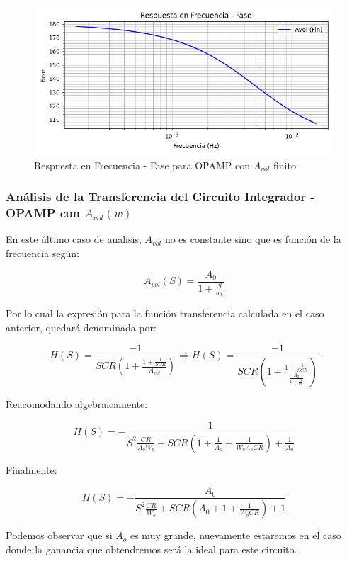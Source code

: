 \begin{figure}[H]
    \centering 
    \includegraphics [scale=1] {../Ejercicio3-CircuitoIntegradoresyDerivadores/Imagenes/teorico-avol-fin-integrador-fase.png} 
    \caption{Respuesta en Frecuencia - Fase para OPAMP con $A_{vol}$ finito}
    \label{fig:emptyPlotTool}
\end{figure}

\subsubsection{Análisis de la Transferencia del Circuito Integrador - OPAMP con $A_{vol}(w)$}

En este último caso de analisis, $A_{vol}$ no es constante sino que es función de la frecuencia según:

$$A_{vol}(S)=\frac{A_0}{1+\frac{S}{w_b}}$$

Por lo cual la expresión para la función transferencia calculada en el caso anterior, quedará denominada por:

$$H(S)= \frac{-1}{SCR(1+\frac{1+\frac{1}{SCR}}{A_{vol}})}\Longrightarrow H(S)= \frac{-1}{SCR(1+\frac{1+\frac{1}{SCR}}{\frac{A_0}{1+\frac{S}{w_b}}})}$$ 

Reacomodando algebraicamente:

$$H(S)=- \frac{1}{S^2\frac{CR}{A_oW_b}+SCR(1 + \frac{1}{A_o}+\frac{1}{W_bA_oCR}) + \frac{1}{A_0}}$$

Finalmente:

$$H(S)=- \frac{{A_0}}{S^2\frac{CR}{W_b}+SCR({A_0} + 1+\frac{1}{W_bCR}) + 1 }$$

Podemos observar que si $A_o$ es muy grande, nuevamente estaremos en el caso donde la ganancia que obtendremos será la ideal para este circuito.

